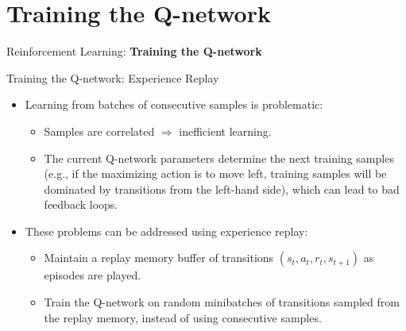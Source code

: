 \section{Training the Q-network}
\begin{frame}{}
    \LARGE Reinforcement Learning: \textbf{Training the Q-network}
\end{frame}

\begin{frame}{Training the Q-network: Experience Replay}
    \begin{itemize}
        \item Learning from batches of consecutive samples is problematic:
        \begin{itemize}
            \item Samples are correlated $\Rightarrow$ inefficient learning.
            \item The current Q-network parameters determine the next training samples (e.g., if the maximizing action is to move left, training samples will be dominated by transitions from the left-hand side), which can lead to bad feedback loops.
        \end{itemize}
        \pause
        \item These problems can be addressed using experience replay:
        \begin{itemize}
            \item Maintain a replay memory buffer of transitions $(s_t, a_t, r_t, s_{t+1})$ as episodes are played.
            \item Train the Q-network on random minibatches of transitions sampled from the replay memory, instead of using consecutive samples.
        \end{itemize}
    \end{itemize}
\end{frame}